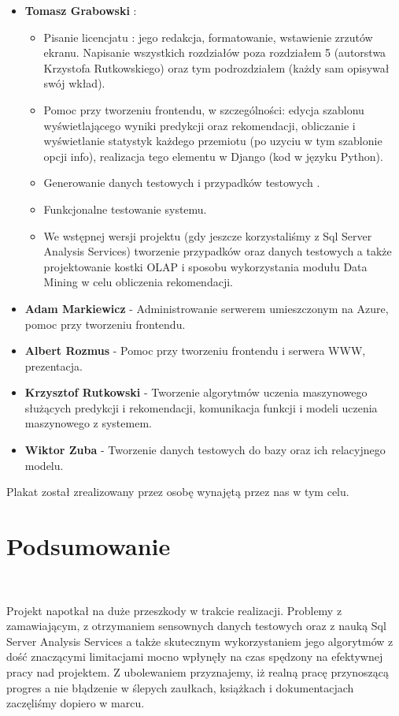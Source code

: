 \documentclass[licencjacka]{pracamgr}
\begin{document}
\begin{itemize}
\item \textbf{Tomasz Grabowski} :
    \begin{itemize} 
    \item Pisanie licencjatu : jego redakcja, formatowanie, wstawienie zrzutów ekranu. Napisanie wszystkich rozdziałów poza rozdziałem 5 (autorstwa Krzystofa Rutkowskiego) oraz tym podrozdziałem (każdy sam opisywał swój wkład).
    \item Pomoc przy tworzeniu frontendu, w szczególności: edycja szablonu wyświetlającego wyniki predykcji oraz rekomendacji, obliczanie i wyświetlanie statystyk każdego przemiotu (po uzyciu w tym szablonie opcji info), realizacja tego elementu w Django (kod w języku Python). 
    \item Generowanie danych testowych i przypadków testowych .
    \item Funkcjonalne testowanie systemu. 
    \item We wstępnej wersji projektu (gdy jeszcze korzystaliśmy z Sql Server Analysis Services) tworzenie przypadków oraz danych testowych a także projektowanie kostki OLAP i sposobu wykorzystania modułu Data Mining w celu obliczenia rekomendacji.
    \end{itemize}

\item \textbf{Adam Markiewicz} - Administrowanie serwerem umieszczonym na Azure, pomoc przy tworzeniu frontendu.
\item \textbf{Albert Rozmus} - Pomoc przy tworzeniu frontendu i serwera WWW, prezentacja.
\item \textbf{Krzysztof Rutkowski} - Tworzenie algorytmów uczenia maszynowego służących predykcji i rekomendacji, komunikacja funkcji i modeli uczenia maszynowego z systemem. 
\item \textbf{Wiktor Zuba} - Tworzenie danych testowych do bazy oraz ich relacyjnego modelu. 
\end{itemize}

Plakat został zrealizowany przez osobę wynajętą przez nas w tym celu.

\chapter{Podsumowanie} ~\\ \indent


Projekt napotkał na duże przeszkody w trakcie realizacji. Problemy z zamawiającym, z otrzymaniem sensownych danych testowych oraz z nauką Sql Server Analysis Services a także skutecznym wykorzystaniem jego algorytmów z dość znaczącymi limitacjami mocno wpłynęły na czas spędzony na efektywnej pracy nad projektem. Z ubolewaniem przyznajemy, iż realną pracę przynoszącą progres a nie błądzenie w ślepych zaułkach, książkach i dokumentacjach zaczęliśmy dopiero w marcu.
\end{document}

